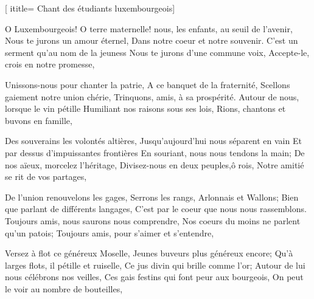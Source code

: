  [
ititle= {Chant des étudiants luxembourgeois}]

\beginverse
O Luxembourgeois! O terre maternelle!
nous, les enfants, au seuil de l'avenir,
Nous te jurons un amour éternel,
Dans notre coeur et notre souvenir.
C'est un serment qu'au nom de la jeuness
Nous te jurons d'une commune voix,
Accepte-le, crois en notre promesse,
\endverse

\beginverse
Unissons-nous pour chanter la patrie,
A ce banquet de la fraternité,
Scellons gaiement notre union chérie,
Trinquons, amis, à sa prospérité.
Autour de nous, lorsque le vin pétille
Humiliant nos raisons sous ses lois,
Rions, chantons et buvons en famille,
\endverse

\beginverse
Des souverains les volontés altières,
Jusqu'aujourd'hui nous séparent en vain
Et par dessus d'impuissantes frontières
En souriant, nous nous tendons la main;
De nos aïeux, morcelez l'héritage,
Divisez-nous en deux peuples,ô rois,
Notre amitié se rit de vos partages,
\endverse

\beginverse
De l'union renouvelons les gages,
Serrons les rangs, Arlonnais et Wallons;
Bien que parlant de différents langages,
C'est par le coeur que nous nous rassemblons.
Toujours amis, nous saurons nous comprendre,
Nos coeurs du moins ne parlent qu'un patois;
Toujours amis, pour s'aimer et s'entendre,
\endverse

\beginverse
Versez à flot ce généreux Moselle,
Jeunes buveurs plus généreux encore;
Qu'à larges flots, il pétille et ruiselle,
Ce jus divin qui brille comme l'or;
Autour de lui nous célébrons nos veilles,
Ces gais festins qui font peur aux bourgeois,
On peut le voir au nombre de bouteilles,
\endverse

\endsong

